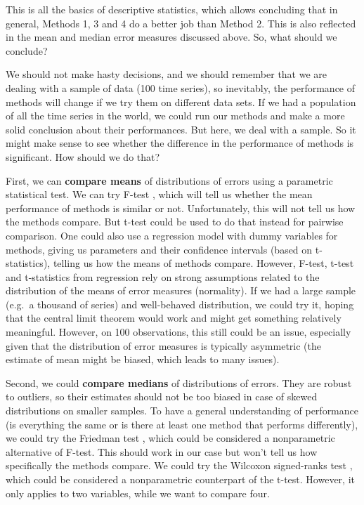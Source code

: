 \documentclass[
]{book}
\theoremstyle{definition}
\theoremstyle{definition}
\theoremstyle{definition}
\theoremstyle{definition}
\theoremstyle{remark}
\begin{document}
This is all the basics of descriptive statistics, which allows concluding that in general, Methods 1, 3 and 4 do a better job than Method 2. This is also reflected in the mean and median error measures discussed above. So, what should we conclude?

We should not make hasty decisions, and we should remember that we are dealing with a sample of data (100 time series), so inevitably, the performance of methods will change if we try them on different data sets. If we had a population of all the time series in the world, we could run our methods and make a more solid conclusion about their performances. But here, we deal with a sample. So it might make sense to see whether the difference in the performance of methods is significant. How should we do that?

First, we can \textbf{compare means} of distributions of errors using a parametric statistical test. We can try F-test \citep{WikipediaFTest}, which will tell us whether the mean performance of methods is similar or not. Unfortunately, this will not tell us how the methods compare. But t-test \citep{WikipediaTTest} could be used to do that instead for pairwise comparison. One could also use a regression model with dummy variables for methods, giving us parameters and their confidence intervals (based on t-statistics), telling us how the means of methods compare. However, F-test, t-test and t-statistics from regression rely on strong assumptions related to the distribution of the means of error measures (normality). If we had a large sample (e.g.~a thousand of series) and well-behaved distribution, we could try it, hoping that the central limit theorem would work and might get something relatively meaningful. However, on 100 observations, this still could be an issue, especially given that the distribution of error measures is typically asymmetric (the estimate of mean might be biased, which leads to many issues).

Second, we could \textbf{compare medians} of distributions of errors. They are robust to outliers, so their estimates should not be too biased in case of skewed distributions on smaller samples. To have a general understanding of performance (is everything the same or is there at least one method that performs differently), we could try the Friedman test \citep{WikipediaFriedmanTest}, which could be considered a nonparametric alternative of F-test. This should work in our case but won't tell us how specifically the methods compare. We could try the Wilcoxon signed-ranks test \citep{WikipediaWilcoxonTest}, which could be considered a nonparametric counterpart of the t-test. However, it only applies to two variables, while we want to compare four.
\end{document}
